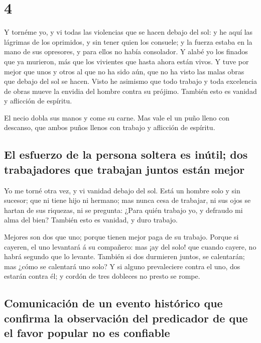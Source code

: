 \hypertarget{section-21-4}{%
\section{4}\label{section-21-4}}

 Y tornéme yo, y vi todas las violencias que se hacen
debajo del sol: y he aquí las lágrimas de los oprimidos, y sin tener
quien los consuele; y la fuerza estaba en la mano de sus opresores, y
para ellos no había consolador.  Y alabé yo los finados
que ya murieron, más que los vivientes que hasta ahora están vivos.
 Y tuve por mejor que unos y otros al que no ha sido aún,
que no ha visto las malas obras que debajo del sol se hacen.
 Visto he asimismo que todo trabajo y toda excelencia de
obras mueve la envidia del hombre contra su prójimo. También esto es
vanidad y aflicción de espíritu.

 El necio dobla sus manos y come su carne. 
Mas vale el un puño lleno con descanso, que ambos puños llenos con
trabajo y aflicción de espíritu.

\hypertarget{el-esfuerzo-de-la-persona-soltera-es-inuxfatil-dos-trabajadores-que-trabajan-juntos-estuxe1n-mejor}{%
\subsection{El esfuerzo de la persona soltera es inútil; dos
trabajadores que trabajan juntos están
mejor}\label{el-esfuerzo-de-la-persona-soltera-es-inuxfatil-dos-trabajadores-que-trabajan-juntos-estuxe1n-mejor}}

 Yo me torné otra vez, y vi vanidad debajo del sol.
 Está un hombre solo y sin sucesor; que ni tiene hijo ni
hermano; mas nunca cesa de trabajar, ni sus ojos se hartan de sus
riquezas, ni se pregunta: ¿Para quién trabajo yo, y defraudo mi alma del
bien? También esto es vanidad, y duro trabajo.

 Mejores son dos que uno; porque tienen mejor paga de su
trabajo.  Porque si cayeren, el uno levantará á su
compañero: mas ¡ay del solo! que cuando cayere, no habrá segundo que lo
levante.  También si dos durmieren juntos, se calentarán;
mas ¿cómo se calentará uno solo?  Y si alguno
prevaleciere contra el uno, dos estarán contra él; y cordón de tres
dobleces no presto se rompe.

\hypertarget{comunicaciuxf3n-de-un-evento-histuxf3rico-que-confirma-la-observaciuxf3n-del-predicador-de-que-el-favor-popular-no-es-confiable}{%
\subsection{Comunicación de un evento histórico que confirma la
observación del predicador de que el favor popular no es
confiable}\label{comunicaciuxf3n-de-un-evento-histuxf3rico-que-confirma-la-observaciuxf3n-del-predicador-de-que-el-favor-popular-no-es-confiable}}

